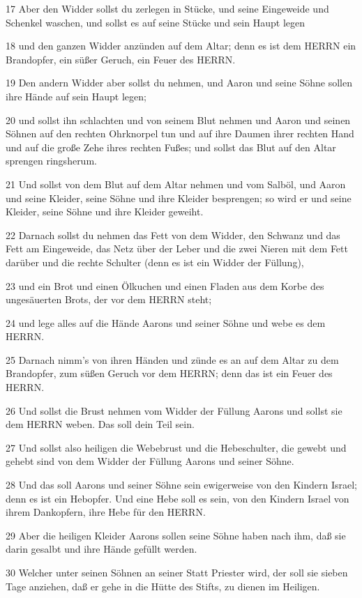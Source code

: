 \par 17 Aber den Widder sollst du zerlegen in Stücke, und seine Eingeweide und Schenkel waschen, und sollst es auf seine Stücke und sein Haupt legen
\par 18 und den ganzen Widder anzünden auf dem Altar; denn es ist dem HERRN ein Brandopfer, ein süßer Geruch, ein Feuer des HERRN.
\par 19 Den andern Widder aber sollst du nehmen, und Aaron und seine Söhne sollen ihre Hände auf sein Haupt legen;
\par 20 und sollst ihn schlachten und von seinem Blut nehmen und Aaron und seinen Söhnen auf den rechten Ohrknorpel tun und auf ihre Daumen ihrer rechten Hand und auf die große Zehe ihres rechten Fußes; und sollst das Blut auf den Altar sprengen ringsherum.
\par 21 Und sollst von dem Blut auf dem Altar nehmen und vom Salböl, und Aaron und seine Kleider, seine Söhne und ihre Kleider besprengen; so wird er und seine Kleider, seine Söhne und ihre Kleider geweiht.
\par 22 Darnach sollst du nehmen das Fett von dem Widder, den Schwanz und das Fett am Eingeweide, das Netz über der Leber und die zwei Nieren mit dem Fett darüber und die rechte Schulter (denn es ist ein Widder der Füllung),
\par 23 und ein Brot und einen Ölkuchen und einen Fladen aus dem Korbe des ungesäuerten Brots, der vor dem HERRN steht;
\par 24 und lege alles auf die Hände Aarons und seiner Söhne und webe es dem HERRN.
\par 25 Darnach nimm's von ihren Händen und zünde es an auf dem Altar zu dem Brandopfer, zum süßen Geruch vor dem HERRN; denn das ist ein Feuer des HERRN.
\par 26 Und sollst die Brust nehmen vom Widder der Füllung Aarons und sollst sie dem HERRN weben. Das soll dein Teil sein.
\par 27 Und sollst also heiligen die Webebrust und die Hebeschulter, die gewebt und gehebt sind von dem Widder der Füllung Aarons und seiner Söhne.
\par 28 Und das soll Aarons und seiner Söhne sein ewigerweise von den Kindern Israel; denn es ist ein Hebopfer. Und eine Hebe soll es sein, von den Kindern Israel von ihrem Dankopfern, ihre Hebe für den HERRN.
\par 29 Aber die heiligen Kleider Aarons sollen seine Söhne haben nach ihm, daß sie darin gesalbt und ihre Hände gefüllt werden.
\par 30 Welcher unter seinen Söhnen an seiner Statt Priester wird, der soll sie sieben Tage anziehen, daß er gehe in die Hütte des Stifts, zu dienen im Heiligen.
